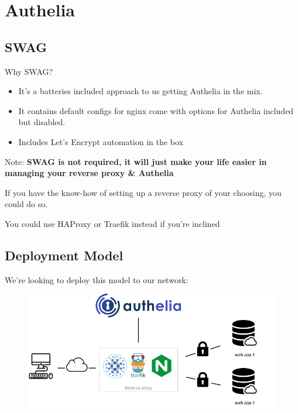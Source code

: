 \documentclass{beamer}
\begin{document}
\section{Authelia}
\subsection{SWAG}

\begin{frame}
    \begin{center}
        Why SWAG?
    \end{center}
    \begin{itemize}
        \item It's a batteries included approach to us getting Authelia in the mix.
        \item It contains default configs for nginx come with options for Authelia included but disabled.
        \item Includes Let's Encrypt automation in the box 
    \end{itemize}
\end{frame}

\begin{frame}
    \begin{center}
        Note: \textbf{SWAG is not required, it will just make your life easier in managing your reverse proxy \& Authelia}
        \vspace{5mm}\par\noindent
        If you have the know-how of setting up a reverse proxy of your choosing, you could do so. 
        \vspace{5mm}\par\noindent
        You could use HAProxy or Traefik instead if you're inclined
    \end{center}
\end{frame}

\subsection{Deployment Model}

\begin{frame}
    We're looking to deploy this model to our network:
    \begin{figure}
        \centering
        \includegraphics[width=\textwidth,keepaspectratio]{../resources/archi.png}
    \end{figure}
\end{frame}
\end{document}

